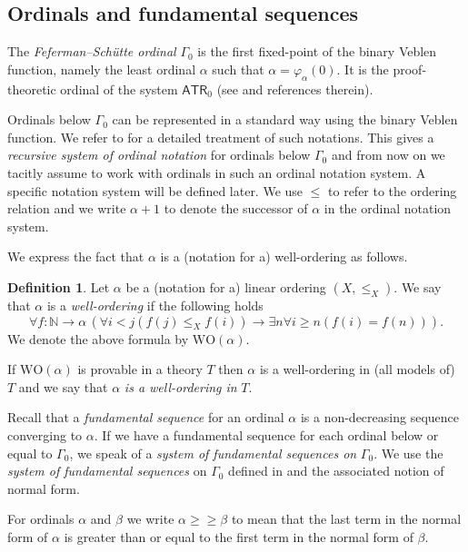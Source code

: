 \documentclass[11pt]{amsart}
\theoremstyle{definition}
\newtheorem{definition}[thm]{Definition}
\theoremstyle{remark}
\theoremstyle{plain}
\newcommand{\numberset}{\mathbb}
\newcommand{\N}{\numberset{N}}
\def\a{\alpha}
\def\b{\beta}
\def\G{\Gamma}
\def\ggeq{\mathrel{\geq\!\!\!\geq}}
\newcommand{\ATR}{\mathsf{ATR}_0}
\def\WO{{\textrm{WO}}}
\def\N{{\mathbb{N}}}
\newcommand{\andrea}[1]{\textcolor{green}{#1}}
\begin{document}
%
%

\subsection{Ordinals and fundamental sequences}\label{ssec:ordinals}

%
%

The \textit{Feferman–Schütte ordinal} $\G_0$ is the first fixed-point of the binary Veblen function, namely the least ordinal $\a$ such that $\a = \varphi_\a (0)$.
It is the proof-theoretic ordinal of the system $\ATR$ (see \cite{simpson} and references therein). 

Ordinals below $\G_0$ can be represented in a standard way using the binary Veblen function. 
We refer to \cite{pohlers} for a detailed treatment of such notations.
This gives a \textit{recursive system of ordinal notation} for ordinals below $\G_0$ and from now on we tacitly assume to work with ordinals in such an ordinal notation system. 
A specific notation system will be defined later.
We use $\le$ to refer to the ordering relation and we write $\alpha + 1$ to denote the successor of $\alpha$ in the ordinal notation system.

We express the fact that $\a$ is a (notation for a) well-ordering as follows. 

\begin{definition}\label{wellorderingdef}
Let $\a$ be a (notation for a) linear ordering $(X, \leq_X)$. 
We say that $\a$ is a \textit{well-ordering} if the following holds
$$\forall f\colon\N\to\a\, (\forall i<j( f(j)\le_X f(i)) \rightarrow \exists n\forall i\geq n (f(i)=f(n))).$$
We denote the above formula by $\WO(\a)$.
\end{definition}

If $\WO(\a)$ is provable in a theory $T$ then $\a$ is a well-ordering in (all models of) $T$ and we say that $\a$ {\em is a well-ordering in} $T$.

Recall that a {\em fundamental sequence} for an ordinal $\a$ is a non-decreasing sequence converging to $\a$.
If we have a fundamental sequence for each ordinal below or equal to $\G_0$, we speak of a {\em system of fundamental sequences on} $\G_0$.
We use the \textit{system of fundamental sequences} on $\G_0$ defined in \cite{marcone2025} and the associated notion of normal form.

For ordinals $\a$ and $\b$ we write $\a \ggeq \b$ to mean that the last term in the normal form of $\a$ is greater than or equal to the first term in the normal form of $\b$.
\end{document}
